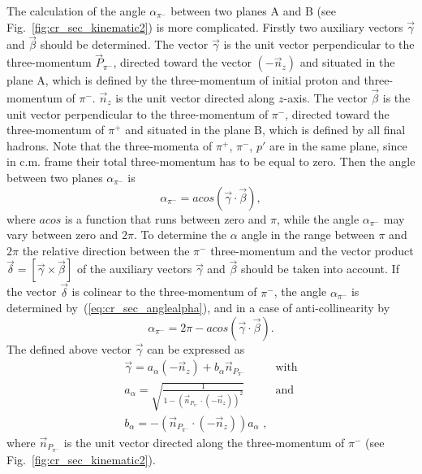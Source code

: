 The calculation of the angle $\alpha_{\pi^{-}}$
 between two planes A and B (see Fig.~\ref{fig:cr_sec_kinematic2})
is more complicated. Firstly two
auxiliary vectors $\vec \gamma$  and
$\vec \beta$ should be determined. The vector $\vec \gamma$ is the unit vector perpendicular to the three-momentum
$\vec P_{\pi^{-}}$, directed toward the vector $(-\vec n_{z})$ and situated in the plane A, which is defined by 
the three-momentum of initial proton and three-momentum of $\pi^{-}$. $\vec
n_{z}$ is the unit vector directed along $z$-axis.
The vector $\vec \beta$ is the unit vector perpendicular to the three-momentum of $\pi^{-}$, 
directed toward the three-momentum of $\pi^{+}$ and situated in the plane B, which is defined 
by all final hadrons. Note that the three-momenta of $\pi^{+}$,
$\pi^{-}$, $p'$ are in the same plane, since in c.m. frame
their total three-momentum has to be equal to zero.
 Then the angle between two planes  $\alpha_{\pi^{-}}$ is
\begin{equation}
\alpha_{\pi^{-}} = acos(\vec \gamma \cdot \vec \beta),
\label{eq:cr_sec_anglealpha}
\end{equation}
where $acos$ is a function that runs between zero and
$\pi$, while the angle $\alpha_{\pi^{-}}$ may vary between zero and
$2\pi$. To determine the $\alpha$ angle in the
range between $\pi$ and $2\pi$ 
the relative direction between the $\pi^{-}$ three-momentum and the vector product $\vec \delta = [ \vec \gamma \times \vec \beta ]$ of the auxiliary vectors $\vec
\gamma$ and $\vec \beta$ should be taken into account.
If the vector $\vec \delta$ is colinear to the three-momentum of $\pi^{-}$, the angle $\alpha_{\pi^{-}}$ is determined
by~(\ref{eq:cr_sec_anglealpha}), and in a case of anti-collinearity by
\begin{equation}
\alpha_{\pi^{-}} = 2\pi - acos(\vec \gamma \cdot \vec \beta).
\label{eq:cr_sec_anglealpha_var}
\end{equation}
The defined above vector $\vec \gamma$ can be expressed as
\begin{eqnarray}
\vec \gamma = a_{\alpha}(-\vec n_{z}) + b_{\alpha}\vec n_{P_{\pi^{-}}} & \text{with} \nonumber \\
a_{\alpha} = \sqrt{\frac{1}{1 - (\vec n_{P_{\pi^{-}}} \cdot (-\vec n_{z} ) )^{2}}} & \text{and} \label{alphavec}\\
b_{\alpha} = - (\vec n_{P_{\pi^{-}}} \cdot (-\vec n_{z} ) ) a_{\alpha} \textrm{ ,} \nonumber
\end{eqnarray} 
where $\vec n_{P_{\pi^{-}}}$ is the unit vector directed along the three-momentum of $\pi^{-}$ (see Fig.~\ref{fig:cr_sec_kinematic2}).

